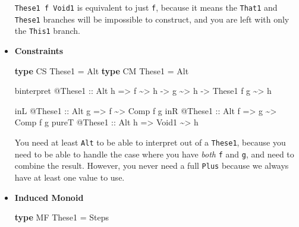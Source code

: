 \documentclass[]{article}
\newenvironment{Shaded}{}{}
\newcommand{\DataTypeTok}[1]{\textcolor[rgb]{0.56,0.13,0.00}{#1}}
\newcommand{\KeywordTok}[1]{\textcolor[rgb]{0.00,0.44,0.13}{\textbf{#1}}}
\newcommand{\NormalTok}[1]{#1}
\newcommand{\OperatorTok}[1]{\textcolor[rgb]{0.40,0.40,0.40}{#1}}
\newcommand{\OtherTok}[1]{\textcolor[rgb]{0.00,0.44,0.13}{#1}}
\begin{document}
\begin{itemize}
  \texttt{These1\ f\ Void1} is equivalent to just \texttt{f}, because it means
  the \texttt{That1} and \texttt{These1} branches will be impossible to
  construct, and you are left with only the \texttt{This1} branch.
\item
  \textbf{Constraints}

\begin{Shaded}
\begin{Highlighting}[]
\KeywordTok{type} \DataTypeTok{CS} \DataTypeTok{These1} \OtherTok{=} \DataTypeTok{Alt}
\KeywordTok{type} \DataTypeTok{CM} \DataTypeTok{These1} \OtherTok{=} \DataTypeTok{Alt}

\NormalTok{binterpret }\OperatorTok{@}\DataTypeTok{These1}
\OtherTok{    ::} \DataTypeTok{Alt}\NormalTok{ h}
    \OtherTok{=>}\NormalTok{ f }\OperatorTok{\textasciitilde{}>}\NormalTok{ h}
    \OtherTok{{-}>}\NormalTok{ g }\OperatorTok{\textasciitilde{}>}\NormalTok{ h}
    \OtherTok{{-}>} \DataTypeTok{These1}\NormalTok{ f g }\OperatorTok{\textasciitilde{}>}\NormalTok{ h}

\NormalTok{inL   }\OperatorTok{@}\DataTypeTok{These1}\OtherTok{ ::} \DataTypeTok{Alt}\NormalTok{ g }\OtherTok{=>}\NormalTok{ f     }\OperatorTok{\textasciitilde{}>} \DataTypeTok{Comp}\NormalTok{ f g}
\NormalTok{inR   }\OperatorTok{@}\DataTypeTok{These1}\OtherTok{ ::} \DataTypeTok{Alt}\NormalTok{ f }\OtherTok{=>}\NormalTok{ g     }\OperatorTok{\textasciitilde{}>} \DataTypeTok{Comp}\NormalTok{ f g}
\NormalTok{pureT }\OperatorTok{@}\DataTypeTok{These1}\OtherTok{ ::} \DataTypeTok{Alt}\NormalTok{ h }\OtherTok{=>} \DataTypeTok{Void1} \OperatorTok{\textasciitilde{}>}\NormalTok{ h}
\end{Highlighting}
\end{Shaded}

  You need at least \texttt{Alt} to be able to interpret out of a
  \texttt{These1}, because you need to be able to handle the case where you have
  \emph{both} \texttt{f} and \texttt{g}, and need to combine the result.
  However, you never need a full \texttt{Plus} because we always have at least
  one value to use.
\item
  \textbf{Induced Monoid}

\begin{Shaded}
\begin{Highlighting}[]
\KeywordTok{type} \DataTypeTok{MF} \DataTypeTok{These1} \OtherTok{=} \DataTypeTok{Steps}
\end{Highlighting}
\end{Shaded}


\end{itemize}
\end{document}
